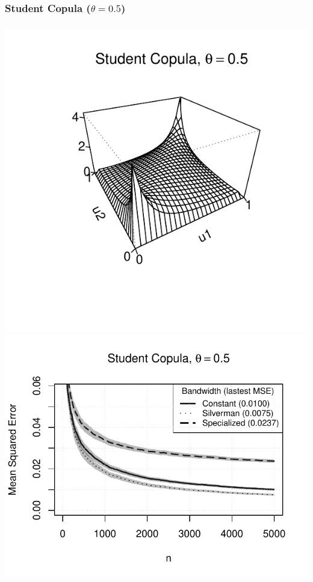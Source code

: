 \documentclass[aspectratio=169]{beamer}
\begin{document}
		\subsubsection{Student Copula ($ \theta = 0.5 $)}
			\begin{frame}
				\frametitle{\insertsubsubsection}
				
				\begin{flushleft}
					\includegraphics[width=0.4\linewidth]{plots/numerical_results/student05}
					\includegraphics[width=0.5\linewidth]{../text/plots/experiment_results/student05}
				\end{flushleft}
				
			\end{frame}		
			
		
\end{document}
